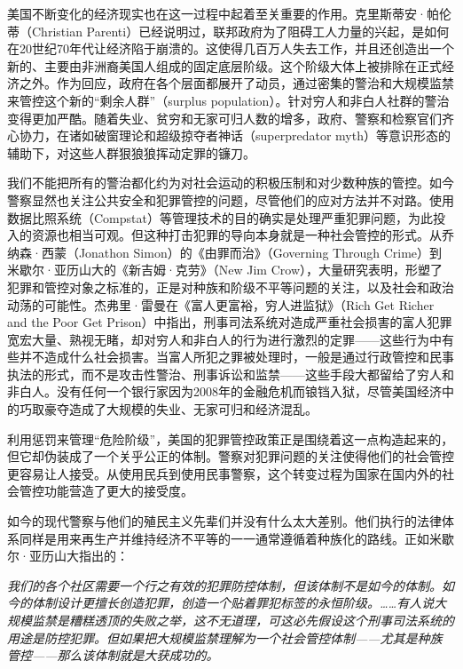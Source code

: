 \documentclass[fontset=fandol, a4paper, 12pt, openright]{ctexbook}
\renewenvironment{quote}
  {\list{}{\rightmargin\leftmargin}%
   \item\relax\small\itshape\color{black}}
  {\endlist}
\begin{document}
美国不断变化的经济现实也在这一过程中起着至关重要的作用。克里斯蒂安·帕伦蒂（Christian Parenti）已经说明过，联邦政府为了阻碍工人力量的兴起，是如何在20世纪70年代让经济陷于崩溃的。这使得几百万人失去工作，并且还创造出一个新的、主要由非洲裔美国人组成的固定底层阶级。这个阶级大体上被排除在正式经济之外。作为回应，政府在各个层面都展开了动员，通过密集的警治和大规模监禁来管控这个新的“剩余人群”（surplus population）。针对穷人和非白人社群的警治变得更加严酷。随着失业、贫穷和无家可归人数的增多，政府、警察和检察官们齐心协力，在诸如破窗理论和超级掠夺者神话（superpredator myth）等意识形态的辅助下，对这些人群狠狼狼挥动定罪的镰刀。

我们不能把所有的警治都化约为对社会运动的积极压制和对少数种族的管控。如今警察显然也关注公共安全和犯罪管控的问题，尽管他们的应对方法并不对路。使用数据比照系统（Compstat）等管理技术的目的确实是处理严重犯罪问题，为此投入的资源也相当可观。但这种打击犯罪的导向本身就是一种社会管控的形式。从乔纳森·西蒙（Jonathon Simon）的《由罪而治》（Governing Through Crime）到米歇尔·亚历山大的《新吉姆·克劳》（New Jim Crow），大量研究表明，形塑了犯罪和管控对象之标准的，正是对种族和阶级不平等问题的关注，以及社会和政治动荡的可能性。杰弗里·雷曼在《富人更富裕，穷人进监狱》（Rich Get Richer and the Poor Get Prison）中指出，刑事司法系统对造成严重社会损害的富人犯罪宽宏大量、熟视无睹，却对穷人和非白人的行为进行激烈的定罪——这些行为中有些并不造成什么社会损害。当富人所犯之罪被处理时，一般是通过行政管控和民事执法的形式，而不是攻击性警治、刑事诉讼和监禁——这些手段大都留给了穷人和非白人。没有任何一个银行家因为2008年的金融危机而锒铛入狱，尽管美国经济中的巧取豪夺造成了大规模的失业、无家可归和经济混乱。

利用惩罚来管理“危险阶级”，美国的犯罪管控政策正是围绕着这一点构造起来的，但它却伪装成了一个关乎公正的体制。警察对犯罪问题的关注使得他们的社会管控更容易让人接受。从使用民兵到使用民事警察，这个转变过程为国家在国内外的社会管控功能营造了更大的接受度。

如今的现代警察与他们的殖民主义先辈们并没有什么太大差别。他们执行的法律体系同样是用来再生产并维持经济不平等的一一通常遵循着种族化的路线。正如米歇尔·亚历山大指出的：

\begin{quote}
我们的各个社区需要一个行之有效的犯罪防控体制，但该体制不是如今的体制。如今的体制设计更擅长创造犯罪，创造一个贴着罪犯标签的永恒阶级。……有人说大规模监禁是糟糕透顶的失败之举，这不无道理，可这必先假设这个刑事司法系统的用途是防控犯罪。但如果把大规模监禁理解为一个社会管控体制——尤其是种族管控——那么该体制就是大获成功的。
\end{quote}
\end{document}
